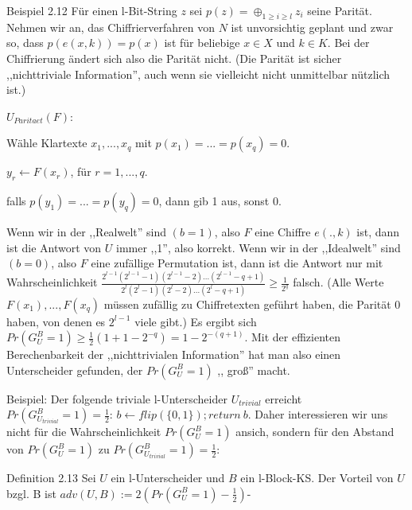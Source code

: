 \documentclass[a4paper]{article}
\begin{document}
\begin{multicols}{3}
    Beispiel 2.12 Für einen l-Bit-String $z$ sei $p(z)=\oplus_{1 \geq i\geq l} z_i$ seine Parität. Nehmen wir an, das Chiffrierverfahren von $N$ ist unvorsichtig geplant und zwar so, dass $p(e(x,k)) =p(x)$ ist für beliebige $x\in X$ und $k\in K$. Bei der Chiffrierung ändert sich also die Parität nicht. (Die Parität ist sicher ,,nichttriviale Information'', auch wenn sie vielleicht nicht unmittelbar nützlich ist.)

    $U_{Paritaet}(F)$:
    \begin{enumerate*}
        \item Wähle Klartexte $x_1,...,x_q$ mit $p(x_1)=...=p(x_q) = 0$.
        \item $y_r\leftarrow F(x_r)$, für $r=1,...,q$.
        \item falls $p(y_1)=...=p(y_q)=0$, dann gib 1 aus, sonst 0.
    \end{enumerate*}

    Wenn wir in der ,,Realwelt'' sind $(b=1)$, also $F$ eine Chiffre $e(.,k)$ ist, dann ist die Antwort von $U$ immer ,,1'', also korrekt. Wenn wir in der ,,Idealwelt'' sind $(b=0)$, also $F$ eine zufällige Permutation ist, dann ist die Antwort nur mit Wahrscheinlichkeit $\frac{2^{l-1} (2^{l-1} -1)(2^{l-1}-2)...(2^{l-1} -q+ 1)}{2^l (2^l-1)(2^l-2)...(2^l-q+ 1)} \geq \frac{1}{2^q}$ falsch. (Alle Werte $F(x_1),...,F(x_q)$ müssen zufällig zu Chiffretexten geführt haben, die Parität 0 haben, von denen es $2^{l-1}$ viele gibt.) Es ergibt sich $Pr(G^B_U= 1)\geq\frac{1}{2} (1+1-2^{-q}) =1-2^{-(q+1)}$. Mit der effizienten Berechenbarkeit der ,,nichttrivialen Information'' hat man also einen Unterscheider gefunden, der $Pr(G^B_U=1)$ ,, groß'' macht.

    Beispiel: Der folgende triviale l-Unterscheider $U_{trivial}$ erreicht $Pr(G^B_{U_{trivial}}= 1)=\frac{1}{2}$: $b\leftarrow flip(\{0,1\}); return\ b$.
    Daher interessieren wir uns nicht für die Wahrscheinlichkeit $Pr(G^B_U= 1)$ ansich, sondern für den Abstand von $Pr(G^B_U=1)$ zu $Pr(G^B_{U_{trivial}}= 1) =\frac{1}{2}$:

    Definition 2.13 Sei $U$ ein l-Unterscheider und $B$ ein l-Block-KS. Der Vorteil von $U$ bzgl. B ist $adv(U,B):= 2(Pr(G^B_U=1)-\frac{1}{2})$-


\end{multicols}
\end{document}

